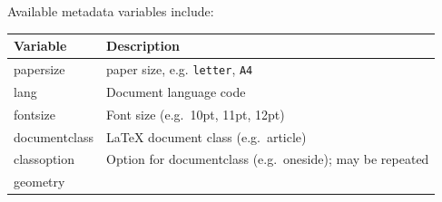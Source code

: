 \documentclass[]{book}
\theoremstyle{definition}
\theoremstyle{definition}
\theoremstyle{definition}
\theoremstyle{remark}
\begin{document}
Available metadata variables include:

\begin{longtable}[]{@{}ll@{}}
\toprule
\begin{minipage}[b]{0.47\columnwidth}\raggedright
Variable\strut
\end{minipage} & \begin{minipage}[b]{0.47\columnwidth}\raggedright
Description\strut
\end{minipage}\tabularnewline
\midrule
\endhead
\begin{minipage}[t]{0.47\columnwidth}\raggedright
papersize\strut
\end{minipage} & \begin{minipage}[t]{0.47\columnwidth}\raggedright
paper size, e.g. \texttt{letter}, \texttt{A4}\strut
\end{minipage}\tabularnewline
\begin{minipage}[t]{0.47\columnwidth}\raggedright
lang\strut
\end{minipage} & \begin{minipage}[t]{0.47\columnwidth}\raggedright
Document language code\strut
\end{minipage}\tabularnewline
\begin{minipage}[t]{0.47\columnwidth}\raggedright
fontsize\strut
\end{minipage} & \begin{minipage}[t]{0.47\columnwidth}\raggedright
Font size (e.g.~10pt, 11pt, 12pt)\strut
\end{minipage}\tabularnewline
\begin{minipage}[t]{0.47\columnwidth}\raggedright
documentclass\strut
\end{minipage} & \begin{minipage}[t]{0.47\columnwidth}\raggedright
LaTeX document class (e.g.~article)\strut
\end{minipage}\tabularnewline
\begin{minipage}[t]{0.47\columnwidth}\raggedright
classoption\strut
\end{minipage} & \begin{minipage}[t]{0.47\columnwidth}\raggedright
Option for documentclass (e.g.~oneside); may be repeated\strut
\end{minipage}\tabularnewline
\begin{minipage}[t]{0.47\columnwidth}\raggedright
geometry\strut
\end{minipage} & \begin{minipage}[t]{0.47\columnwidth}\raggedright

\end{minipage}
\end{longtable}
\end{document}
